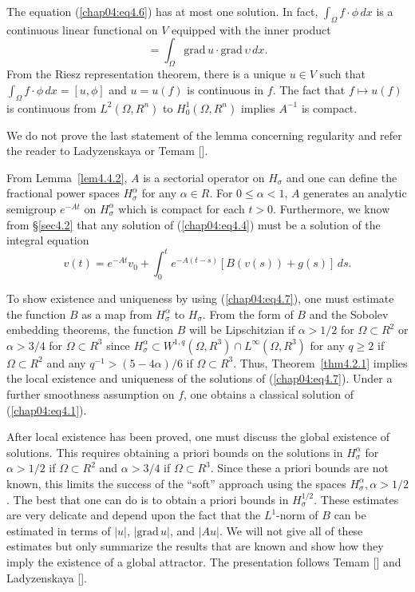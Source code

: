 \documentclass{surv-l}
\theoremstyle{plain}
\theoremstyle{definition}
\numberwithin{equation}{section}
\numberwithin{figure}{chapter}
\begin{document}
The equation (\ref{chap04:eq4.6}) has at most one solution. In fact, $\int_{\Omega}f\cdot\phi\, dx$ is a continuous linear functional on $V$ equipped with the inner product
\begin{equation*}
[u,\upsilon]=\int_{\Omega}\mathrm{grad}\,u\cdot \mathrm{grad}\,\upsilon\, dx.
\end{equation*}
From the Riesz representation theorem, there is a unique $u\in V$ such that $\int_{\Omega}f\cdot\phi\, dx=[u,\phi]$ and $u=u(f)$ is continuous in $f$. The fact that $f\mapsto u(f)$ is continuous from $L^{2}(\Omega, R^{n})$ to $H_{0}^{1}(\Omega, R^{n})$ implies $A^{-1}$ is compact.

We do not prove the last statement of the lemma concerning regularity and refer the reader to Ladyzenskaya
\cite[p. 38]{1963l} or Temam [\citeyear{1979t}].

From Lemma~\ref{lem4.4.2}, $A$ is a sectorial operator on $H_{\sigma}$ and one can define the fractional power spaces $H_{\sigma}^{\alpha}$ for any $\alpha\in R$. For $0\leq\alpha<1,\, A$ generates
an analytic semigroup $e^{-At}$ on $H_{\sigma}^{\alpha}$ which is compact for each $t>0$. Furthermore, we know from \S \ref{sec4.2} that any solution of (\ref{chap04:eq4.4}) must be a solution of the integral equation
\begin{equation}\label{chap04:eq4.7}
v(t)=e^{-At}v_{0}+\int_{0}^{t}e^{-A(t-s)}[B(v(s))+g(s)]\,ds.
\end{equation}

To show existence and uniqueness by using (\ref{chap04:eq4.7}), one must estimate the function $B$ as a map from $H_{\sigma}^{\alpha}$ to $H_{\sigma}$. From the form of $B$ and the Sobolev embedding theorems, the function $B$ will be Lipschitzian if $\alpha>1/2$ for $\Omega\subset R^{2}$ or $\alpha>3/4$ for $\Omega\subset R^{3}$ since $H_{\sigma}^{\alpha}\subset W^{1,q}(\Omega, R^{3})\cap L^{\infty}(\Omega, R^{3})$ for any $q\geq 2$ if $\Omega\subset R^{2}$ and any $q^{-1}>(5-4\alpha)/6$ if $\Omega \subset R^{3}$. Thus, Theorem~\ref{thm4.2.1} implies the local existence and uniqueness of the solutions of (\ref{chap04:eq4.7}). Under a further smoothness assumption on $f$, one obtains a classical solution of (\ref{chap04:eq4.1}).

After local existence has been proved, one must discuss the global existence of solutions. This requires obtaining a priori bounds on the solutions in $H_{\sigma}^{\alpha}$ for $\alpha>1/2$ if $\Omega \subset R^{2}$ and $\alpha>3/4$ if $\Omega \subset R^{3}$. Since these a priori bounds are not known, this limits the success of the ``soft'' approach using the spaces $H_{\sigma}^{\alpha}, \alpha >1/2$. The best that one can do is to obtain a priori bounds in $H_{\sigma}^{1/2}$. These estimates are very delicate and depend upon the fact that the $L^{1}$-norm of $B$ can be estimated in terms of $|u|$, $|\mathrm{grad}\, u|$, and $|Au|$. We will not give all of these estimates but only summarize the results that are known and show how they imply the existence of a global attractor. The presentation follows Temam [\citeyear{1983t}] and Ladyzenskaya [\citeyear{1972l}].
\end{document}
